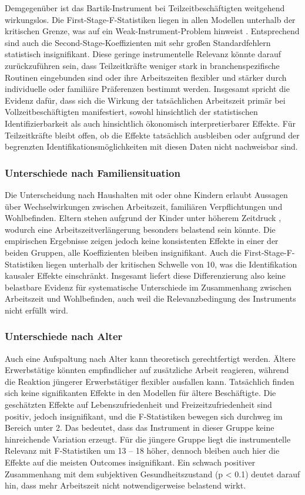 \documentclass[12pt,a4paper]{article}
\begin{document}
Demgegenüber ist das Bartik-Instrument bei Teilzeitbeschäftigten weitgehend wirkungslos. Die First-Stage-F-Statistiken liegen in allen Modellen unterhalb der kritischen Grenze, was auf ein Weak-Instrument-Problem hinweist \parencite{staiger1997}. Entsprechend sind auch die Second-Stage-Koeffizienten mit sehr großen Standardfehlern statistisch insignifikant. Diese geringe instrumentelle Relevanz könnte darauf zurückzuführen sein, dass Teilzeitkräfte weniger stark in branchenspezifische Routinen eingebunden sind oder ihre Arbeitszeiten flexibler und stärker durch individuelle oder familiäre Präferenzen bestimmt werden. Insgesamt spricht die Evidenz dafür, dass sich die Wirkung der tatsächlichen Arbeitszeit primär bei Vollzeitbeschäftigten manifestiert, sowohl hinsichtlich der statistischen Identifizierbarkeit als auch hinsichtlich ökonomisch interpretierbarer Effekte. Für Teilzeitkräfte bleibt offen, ob die Effekte tatsächlich ausbleiben oder aufgrund der begrenzten Identifikationsmöglichkeiten mit diesen Daten nicht nachweisbar sind.

\subsubsection{Unterschiede nach Familiensituation}
Die Unterscheidung nach Haushalten mit oder ohne Kindern erlaubt Aussagen über Wechselwirkungen zwischen Arbeitszeit, familiären Verpflichtungen und Wohlbefinden. Eltern stehen aufgrund der Kinder unter höherem Zeitdruck \parencite{walper2022}, wodurch eine Arbeitszeitverlängerung besonders belastend sein könnte. Die empirischen Ergebnisse zeigen jedoch keine konsistenten Effekte in einer der beiden Gruppen, alle Koeffizienten bleiben insignifikant. Auch die First-Stage-F-Statistiken liegen unterhalb der kritischen Schwelle von 10, was die Identifikation kausaler Effekte einschränkt. Insgesamt liefert diese Differenzierung also keine belastbare Evidenz für systematische Unterschiede im Zusammenhang zwischen Arbeitszeit und Wohlbefinden, auch weil die Relevanzbedingung des Instruments nicht erfüllt wird. 

\subsubsection{Unterschiede nach Alter}
Auch eine Aufspaltung nach Alter kann theoretisch gerechtfertigt werden. Ältere Erwerbstätige könnten empfindlicher auf zusätzliche Arbeit reagieren, während die Reaktion jüngerer Erwerbstätiger flexibler ausfallen kann. 
Tatsächlich finden sich keine signifikanten Effekte in den Modellen für ältere Beschäftigte. Die geschätzten Effekte auf Lebenszufriedenheit und Freizeitzufriedenheit sind positiv, jedoch insignifikant, und die F-Statistiken bewegen sich durchweg im Bereich unter 2. Das bedeutet, dass das Instrument in dieser Gruppe keine hinreichende Variation erzeugt. Für die jüngere Gruppe liegt die instrumentelle Relevanz mit F-Statistiken um 13 -- 18 höher, dennoch bleiben auch hier die Effekte auf die meisten Outcomes insignifikant. Ein schwach positiver Zusammenhang mit dem subjektiven Gesundheitszustand (p < 0.1) deutet darauf hin, dass mehr Arbeitszeit nicht notwendigerweise belastend wirkt. 
\end{document}
